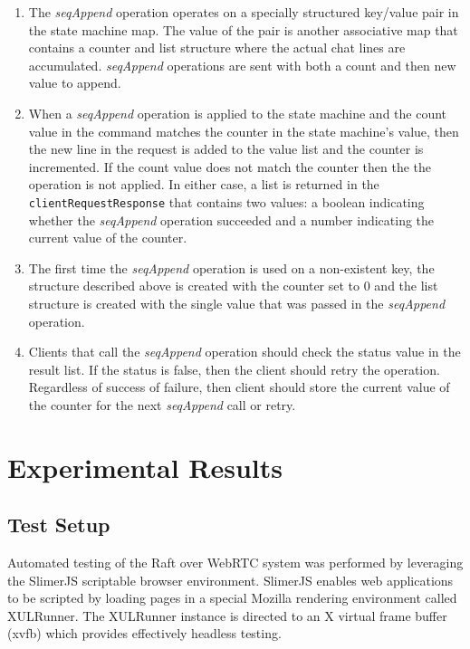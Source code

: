 \documentclass[conference,compsoc]{./IEEEtran/IEEEtran}
\begin{document}
\begin{enumerate}
\item The \emph{seqAppend} operation operates on a specially structured key/value pair in the state machine map. The value of the pair is another associative map that contains a counter and list structure where the actual chat lines are accumulated. \emph{seqAppend} operations are sent with both a count and then new value to append.
\item When a \emph{seqAppend} operation is applied to the state machine and the count value in the command matches the counter in the state machine's value, then the new line in the request is added to the value list and the counter is incremented. If the count value does not match the counter then the the operation is not applied. In either case, a list is returned in the \texttt{clientRequestResponse} that contains two values: a boolean indicating whether the \emph{seqAppend} operation succeeded and a number indicating the current value of the counter.
\item The first time the \emph{seqAppend} operation is used on a non-existent key, the structure described above is created with the counter set to 0 and the list structure is created with the single value that was passed in the \emph{seqAppend} operation.\
\item Clients that call the \emph{seqAppend} operation should check the status value in the result list. If the status is false, then the client should retry the operation. Regardless of success of failure, then client should store the current value of the counter for the next \emph{seqAppend} call or retry.
\end{enumerate}

\section{Experimental Results}

\subsection{Test Setup}

Automated testing of the Raft over WebRTC system was performed by leveraging the SlimerJS scriptable browser environment. SlimerJS enables web applications to be scripted by loading pages in a special Mozilla rendering environment called XULRunner. The XULRunner instance is directed to an X virtual frame buffer (xvfb) which provides effectively headless testing.
\end{document}
